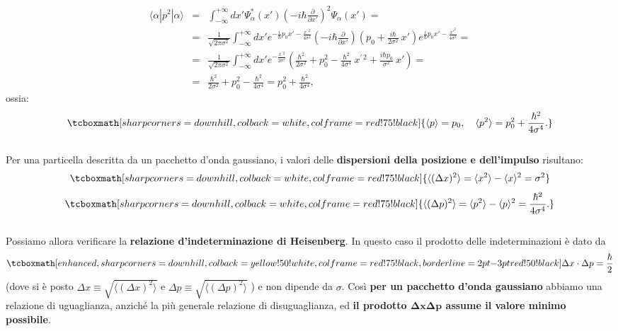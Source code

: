 \documentclass[a4paper,12pt,oneside]{book}
\begin{document}
	\begin{eqnarray}
		\langle \alpha | p^2 | \alpha \rangle  &=& \int_{-\infty}^{+\infty} dx' \Psi ^* _\alpha(x') \left(-i \hbar \frac{\partial}{\partial x'} \right)^2 \Psi_\alpha(x') = \nonumber \\
		&=& \frac{1}{\sqrt{2 \pi \sigma^2}} \int_{-\infty}^{+\infty} dx' e^{-\frac{i}{\hbar}p_0 x' - \frac{x^{\prime \,2}}{4 \sigma^2}} \left(-i \hbar \frac{\partial}{\partial x'} \right)\left(p_0 + \frac{i \hbar}{2 \sigma^2} ~x' \right) e^{\frac{i}{\hbar}p_0 x' - \frac{x'^2}{4 \sigma^2}} = \nonumber \\
		&=& \frac{1}{\sqrt{2 \pi \sigma^2}} \int_{-\infty}^{+\infty} dx'  e^{- \frac{x^{\prime \,2}}{2 \sigma^2}} \left(\frac{\hbar^2}{2 \sigma^2} + p_0^2 - \frac{\hbar^2}{4 \sigma^4}~x^{\prime \,2} + \frac{i \hbar p_0}{\sigma^2}~x' \right) = \nonumber \\
		&=& \frac{\hbar^2}{2 \sigma^2} + p_0^2 - \frac{\hbar^2}{4 \sigma^4} = p_0^2 + \frac{\hbar^2}{4 \sigma^4},
\end{eqnarray}
ossia:
	\begin{equation}
		\tcboxmath[sharp corners=downhill ,colback=white,colframe=red!75!black]{
			\langle p \rangle = p_0, \quad \langle p^2 \rangle = p_0^2 + \frac{\hbar^2}{4 \sigma^4}.
			}
	\end{equation}\\
	
Per una particella descritta da un pacchetto d'onda gaussiano, i valori delle \textbf{dispersioni della posizione e dell'impulso} risultano:
	\begin{equation}
		\tcboxmath[sharp corners=downhill ,colback=white,colframe=red!75!black]{
		\langle (\Delta x)^2 \rangle = \langle x^2 \rangle - \langle x \rangle^2 = \sigma^2
		}
	\end{equation}
	\begin{equation}
		\tcboxmath[sharp corners=downhill ,colback=white,colframe=red!75!black]{
			\langle (\Delta p)^2 \rangle = \langle p^2 \rangle - \langle p \rangle^2 =  \frac{\hbar^2}{4 \sigma^4}.
			}
	\end{equation}\\
	
Possiamo allora verificare la \textbf{relazione d'indeterminazione di Heisenberg}. In questo caso il prodotto delle indeterminazioni è dato da
	\begin{equation}
		\tcboxmath[enhanced,sharp corners=downhill ,colback=yellow!50!white,colframe=red!75!black, borderline={2pt}{-3pt}{red!50!black}]{
		\Delta x \cdot \Delta p = \frac{\hbar}{2}
		}
	\end{equation}
(dove si è posto $\Delta x \equiv \sqrt{\langle (\Delta x)^2 \rangle}$ e $\Delta p \equiv \sqrt{\langle (\Delta p)^2 \rangle}$ ) e non dipende da $\sigma$. Così \textbf{per un pacchetto d'onda gaussiano} abbiamo una relazione di uguaglianza, anziché la più generale relazione di disuguaglianza, ed \textbf{il prodotto $\mathbf{\Delta x \Delta p}$ assume il valore minimo possibile}.\\
\end{document}
